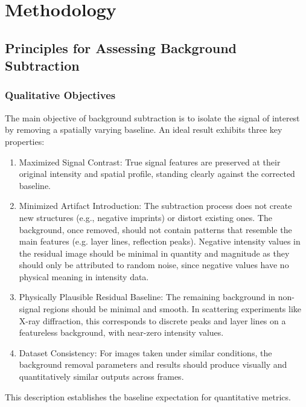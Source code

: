 \documentclass[iucr,review]{iucrjournals}
\begin{document}
\section{Methodology}

\subsection{Principles for Assessing Background Subtraction}
\subsubsection{Qualitative Objectives} 
The main objective of background subtraction is to isolate the signal of interest by removing a spatially varying baseline.
An ideal result exhibits three key properties:
\begin{enumerate}
        \item Maximized Signal Contrast: True signal features are preserved at their original intensity and spatial profile,
        standing clearly against the corrected baseline.
        \item Minimized Artifact Introduction: The subtraction process does not create new structures (e.g., negative imprints)
        or distort existing ones. The background, once removed, should not contain patterns that resemble
        the main features (e.g. layer lines, reflection peaks). Negative intensity values in the residual image
        should be minimal in quantity
        and magnitude as they should only be attributed to random noise, since negative values have no physical meaning in intensity data.
        \item Physically Plausible Residual Baseline: The remaining background in non-signal regions should be minimal and
        smooth. %
        In scattering experiments like X-ray diffraction, this corresponds to discrete peaks and layer lines on a
        featureless background, with near-zero intensity values. 
        \item Dataset Consistency: For images taken under similar conditions, 
        the background removal parameters and results should
        produce visually and quantitatively similar outputs across frames.
\end{enumerate}
This description establishes the baseline expectation for quantitative metrics.
\end{document}
